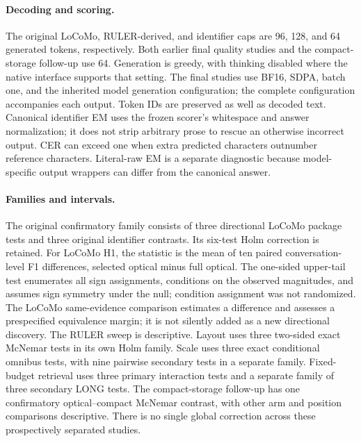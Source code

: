 \paragraph{Decoding and scoring.}
The original LoCoMo, RULER-derived, and identifier caps are 96, 128, and 64 generated tokens, respectively. Both earlier final quality studies and the compact-storage follow-up use 64. Generation is greedy, with thinking disabled where the native interface supports that setting. The final studies use BF16, SDPA, batch one, and the inherited model generation configuration; the complete configuration accompanies each output. Token IDs are preserved as well as decoded text. Canonical identifier EM uses the frozen scorer's whitespace and answer normalization; it does not strip arbitrary prose to rescue an otherwise incorrect output. CER can exceed one when extra predicted characters outnumber reference characters. Literal-raw EM is a separate diagnostic because model-specific output wrappers can differ from the canonical answer.

\paragraph{Families and intervals.}
The original confirmatory family consists of three directional LoCoMo package tests and three original identifier contrasts. Its six-test Holm correction is retained. For LoCoMo H1, the statistic is the mean of ten paired conversation-level F1 differences, selected optical minus full optical. The one-sided upper-tail test enumerates all sign assignments, conditions on the observed magnitudes, and assumes sign symmetry under the null; condition assignment was not randomized. The LoCoMo same-evidence comparison estimates a difference and assesses a prespecified equivalence margin; it is not silently added as a new directional discovery. The RULER sweep is descriptive. Layout uses three two-sided exact McNemar tests in its own Holm family. Scale uses three exact conditional omnibus tests, with nine pairwise secondary tests in a separate family. Fixed-budget retrieval uses three primary interaction tests and a separate family of three secondary LONG tests. The compact-storage follow-up has one confirmatory optical--compact McNemar contrast, with other arm and position comparisons descriptive. There is no single global correction across these prospectively separated studies.

